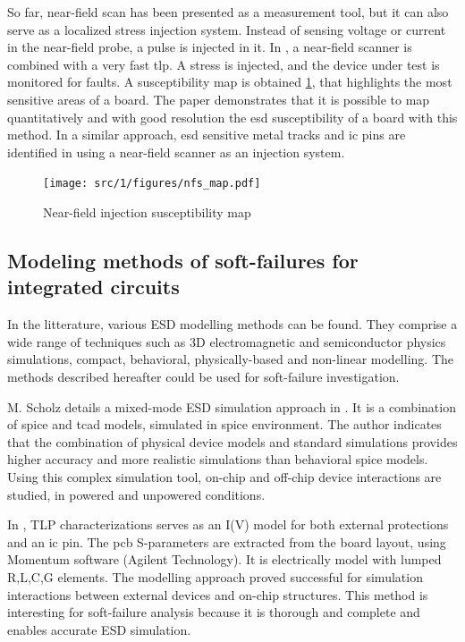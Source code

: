So far, near-field scan has been presented as a measurement tool, but it can also serve as a localized stress injection system.
Instead of sensing voltage or current in the near-field probe, a pulse is injected in it.
In \cite{NearFieldInjectionFabrice}, a near-field scanner is combined with a very fast \gls{tlp}.
A stress is injected, and the device under test is monitored for faults.
A susceptibility map is obtained \ref{fig:near-field-scan-map}, that highlights the most sensitive areas of a board.
The paper demonstrates that it is possible to map quantitatively and with good resolution the \gls{esd} susceptibility of a board with this method.
In a similar approach, \gls{esd} sensitive metal tracks and \gls{ic} pins are identified in \cite{NearFieldInjectionBis} using a near-field scanner as an injection system.

\begin{figure}[!h]
  \centering
  \texttt{[image: src/1/figures/nfs\_map.pdf]}
  \caption{Near-field injection susceptibility map \cite{phd-monnereau}}
  \label{fig:near-field-scan-map}
\end{figure}


\subsection{Modeling methods of soft-failures for integrated circuits}

In the litterature, various ESD modelling methods can be found.
They comprise a wide range of techniques such as 3D electromagnetic and semiconductor physics simulations, compact, behavioral, physically-based and non-linear modelling.
The methods described hereafter could be used for soft-failure investigation.

M. Scholz details a mixed-mode ESD simulation approach in \cite{mixedModeESDSims}.
It is a combination of \gls{spice} and \gls{tcad} models, simulated in \gls{spice} environment.
The author indicates that the combination of physical device models and standard simulations provides higher accuracy and more realistic simulations than behavioral \gls{spice} models.
Using this complex simulation tool, on-chip and off-chip device interactions are studied, in powered and unpowered conditions.

In \cite{usb2ESDProtection}, TLP characterizations serves as an I(V) model for both external protections and an \gls{ic} pin.
The \gls{pcb} S-parameters are extracted from the board layout, using Momentum software (Agilent Technology).
It is electrically model with lumped R,L,C,G elements.
The modelling approach proved successful for simulation interactions between external devices and on-chip structures.
This method is interesting for soft-failure analysis because it is thorough and complete and enables accurate ESD simulation.

